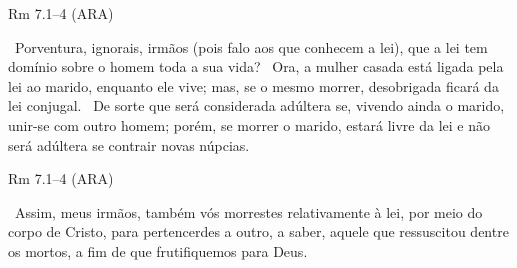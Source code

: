 \documentclass[12pt,aspectratio=169]{beamer}
\newcommand{\ver}[1]{%
    \raisebox{0.50ex}{%
        \scalebox{1.1}{%
            \pmb{\textbf{\textcolor{BSpbg}{#1}}}%
        }%
    }%
}
\newcommand{\QUOTE}[1]{%
    \par\noindent\hspace*{0.05\linewidth}%
    \begin{minipage}{0.9\linewidth}%
        \linespread{1.35}\large{#1}%
    \end{minipage}%
}
\begin{document}
    \begin{frame}{Rm 7.1--4 (ARA)}
        \QUOTE{%
            \ver{1}~Porventura, ignorais, irmãos (pois falo aos que conhecem a lei), que a lei
            tem domínio sobre o homem toda a sua vida?
            \ver{2}~Ora, a mulher casada está ligada pela lei ao marido, enquanto ele vive; mas,
            se o mesmo morrer, desobrigada ficará da lei conjugal.
            \ver{3}~De sorte que será considerada adúltera se, vivendo ainda o marido, unir-se
            com outro homem; porém, se morrer o marido, estará livre da lei e não será adúltera
            se contrair novas núpcias.
            \ver{4}~
        }
    \end{frame}

    \begin{frame}{Rm 7.1--4 (ARA)}
        \QUOTE{%
            \ver{4}~Assim, meus irmãos, também vós morrestes relativamente à lei, por meio do
            corpo de Cristo, para pertencerdes a outro, a saber, aquele que ressuscitou dentre
            os mortos, a fim de que frutifiquemos para Deus.
        }
    \end{frame}

\end{document}
